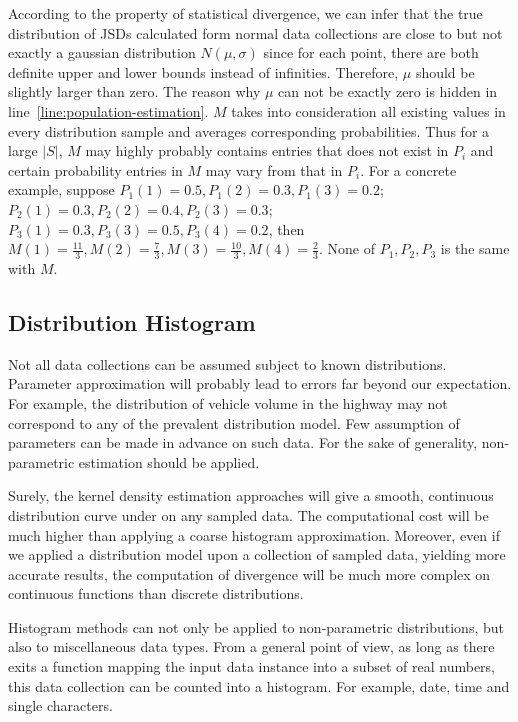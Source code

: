 \documentclass[a4paper]{IEEEtran}
\begin{document}
			According to the property of statistical divergence, we can infer that the true distribution of JSDs calculated form normal data collections are close to but not exactly a gaussian distribution $N(\mu, \sigma)$ since for each point, there are both definite upper and lower bounds instead of infinities. Therefore, $\mu$ should be slightly larger than zero. The reason why $\mu$ can not be exactly zero is hidden in line~\ref{line:population-estimation}. $M$ takes into consideration all existing values in every distribution sample and averages corresponding probabilities. Thus for a large $|S|$, $M$ may highly probably contains entries that does not exist in $P_i$ and certain probability entries in $M$ may vary from that in $P_i$. For a concrete example, suppose $P_1(1)=0.5, P_1(2)=0.3, P_1(3)=0.2$; $P_2(1) = 0.3, P_2(2) = 0.4, P_2(3) = 0.3$; $P_3(1)=0.3, P_3(3)=0.5, P_3(4)=0.2$, then $M(1) = \frac{11}{3}, M(2)=\frac{7}{3}, M(3)=\frac{10}{3}, M(4)=\frac{2}{3}$. None of $P_1, P_2, P_3$ is the same with $M$.
		
		\subsection{Distribution Histogram}\label{sec:alg-histogram}
			Not all data collections can be assumed subject to known distributions. Parameter approximation will probably lead to errors far beyond our expectation. For example, the distribution of vehicle volume in the highway may not correspond to any of the prevalent distribution model. Few assumption of parameters can be made in advance on such data. For the sake of generality, non-parametric estimation should be applied.
			
			Surely, the kernel density estimation approaches will give a smooth, continuous distribution curve under on any sampled data. The computational cost will be much higher than applying a coarse histogram approximation.
			Moreover, even if we applied a distribution model upon a collection of sampled data, yielding more accurate results, the computation of divergence will be much more complex on continuous functions than discrete distributions.
			
			Histogram methods can not only be applied to non-parametric distributions, but also to miscellaneous data types. From a general point of view, as long as there exits a function mapping the input data instance into a subset of real numbers, this data collection can be counted into a histogram. For example, date, time and single characters.
			
\end{document}
